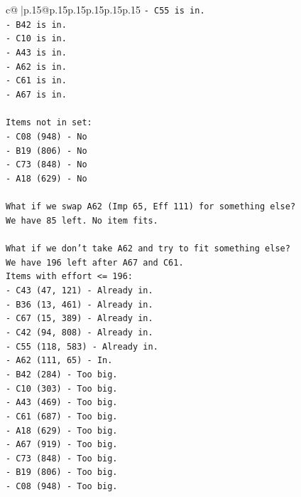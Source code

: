 \documentclass{article}
\begin{document}
{\begin{supertabular}{c@{$\;$}|p{.15\linewidth}@{}p{.15\linewidth}p{.15\linewidth}p{.15\linewidth}p{.15\linewidth}p{.15\linewidth}}
{{{\texttt{{-} C55 is in.} \\
\texttt{{-} B42 is in.} \\
\texttt{{-} C10 is in.} \\
\texttt{{-} A43 is in.} \\
\texttt{{-} A62 is in.} \\
\texttt{{-} C61 is in.} \\
\texttt{{-} A67 is in.} \\
\\ 
\texttt{Items not in set:} \\
\texttt{{-} C08 (948) {-} No} \\
\texttt{{-} B19 (806) {-} No} \\
\texttt{{-} C73 (848) {-} No} \\
\texttt{{-} A18 (629) {-} No} \\
\\ 
\texttt{What if we swap A62 (Imp 65, Eff 111) for something else?} \\
\texttt{We have 85 left. No item fits.} \\
\\ 
\texttt{What if we don't take A62 and try to fit something else?} \\
\texttt{We have 196 left after A67 and C61.} \\
\texttt{Items with effort <= 196:} \\
\texttt{{-} C43 (47, 121) {-} Already in.} \\
\texttt{{-} B36 (13, 461) {-} Already in.} \\
\texttt{{-} C67 (15, 389) {-} Already in.} \\
\texttt{{-} C42 (94, 808) {-} Already in.} \\
\texttt{{-} C55 (118, 583) {-} Already in.} \\
\texttt{{-} A62 (111, 65) {-} In.} \\
\texttt{{-} B42 (284) {-} Too big.} \\
\texttt{{-} C10 (303) {-} Too big.} \\
\texttt{{-} A43 (469) {-} Too big.} \\
\texttt{{-} C61 (687) {-} Too big.} \\
\texttt{{-} A18 (629) {-} Too big.} \\
\texttt{{-} A67 (919) {-} Too big.} \\
\texttt{{-} C73 (848) {-} Too big.} \\
\texttt{{-} B19 (806) {-} Too big.} \\
\texttt{{-} C08 (948) {-} Too big.} \\
}}}
\end{supertabular}}
\end{document}

